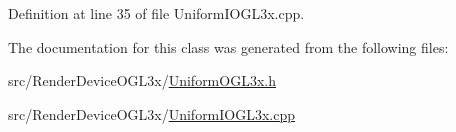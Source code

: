 Definition at line 35 of file Uniform\-I\-O\-G\-L3x.\-cpp.



The documentation for this class was generated from the following files\-:\begin{DoxyCompactItemize}
\item 
src/\-Render\-Device\-O\-G\-L3x/\hyperlink{_uniform_o_g_l3x_8h}{Uniform\-O\-G\-L3x.\-h}\item 
src/\-Render\-Device\-O\-G\-L3x/\hyperlink{_uniform_i_o_g_l3x_8cpp}{Uniform\-I\-O\-G\-L3x.\-cpp}\end{DoxyCompactItemize}
